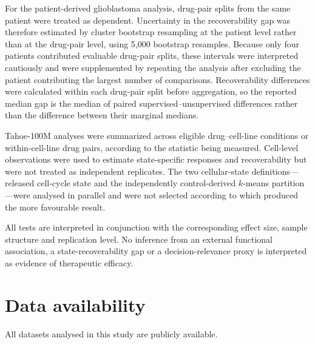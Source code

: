\documentclass[11pt,letterpaper]{article}
\begin{document}
For the patient-derived glioblastoma analysis, drug-pair splits from the same patient were treated
as dependent. Uncertainty in the recoverability gap was therefore estimated by cluster bootstrap
resampling at the patient level rather than at the drug-pair level, using 5,000 bootstrap
resamples. Because only four patients contributed evaluable drug-pair splits, these intervals were
interpreted cautiously and were supplemented by repeating the analysis after excluding the patient
contributing the largest number of comparisons. Recoverability differences were calculated within
each drug-pair split before aggregation, so the reported median gap is the median of paired
supervised--unsupervised differences rather than the difference between their marginal medians.

Tahoe-100M analyses were summarized across eligible drug--cell-line conditions or within-cell-line
drug pairs, according to the statistic being measured. Cell-level observations were used to
estimate state-specific responses and recoverability but were not treated as independent
replicates. The two cellular-state definitions---released cell-cycle state and the independently
control-derived $k$-means partition---were analysed in parallel and were not selected according to
which produced the more favourable result.

All tests are interpreted in conjunction with the corresponding effect size, sample structure and
replication level. No inference from an external functional association, a state-recoverability
gap or a decision-relevance proxy is interpreted as evidence of therapeutic efficacy.






\section*{Data availability}

\sloppy

All datasets analysed in this study are publicly available.
\end{document}
